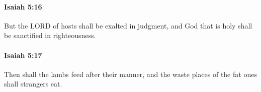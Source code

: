 		\paragraph{Isaiah 5:16} %
			\label{ISAIAH-5-16}

			But the LORD of hosts shall be exalted in judgment, and God that is holy shall be sanctified in righteousness.


		\paragraph{Isaiah 5:17} %
			\label{ISAIAH-5-17}

			Then shall the lambs feed after their manner, and the waste places of the fat ones shall strangers eat.


